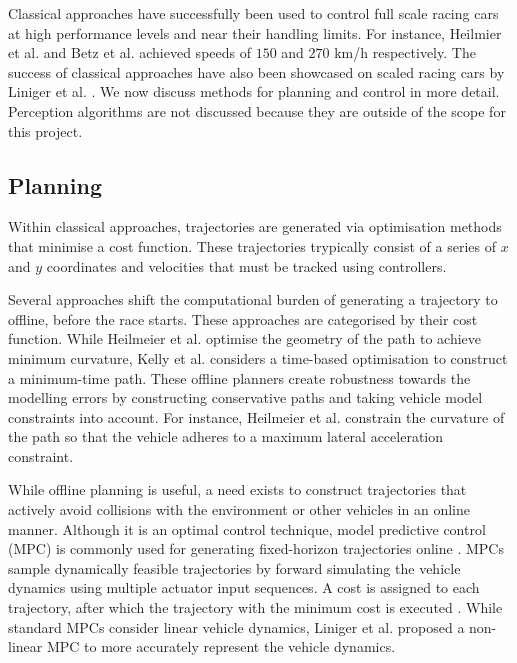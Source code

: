 Classical approaches have successfully been used to control full scale racing cars \cite{Valls2018, alvarez2022, Nekkah2020} at high performance levels and near their handling limits.
For instance, Heilmier et al. \cite{Heilmeier2020} and
Betz et al. \cite{Betz_2023} achieved speeds of $150$ and $270$ km/h respectively.
The success of classical approaches have also been showcased on scaled racing cars by Liniger et al. \cite{Liniger2015}.
We now discuss methods for planning and control in more detail.
Perception algorithms are not discussed because they are outside of the scope for this project.

\subsection{Planning}\label{sec:trajectory_planning}
Within classical approaches, trajectories are generated via optimisation methods that minimise a cost function.
These trajectories trypically consist of a series of $x$ and $y$ coordinates and velocities that must be tracked using controllers.

Several approaches \cite{Heilmeier2020, Kelly2010, Herrmann2019} shift the computational burden of generating a trajectory to offline, before the race starts.
These approaches are categorised by their cost function.
While Heilmeier et al. \cite{Heilmeier2020} optimise the geometry of the path to achieve minimum curvature, Kelly et al. \cite{Kelly2010} considers a time-based optimisation to construct a minimum-time path.
These offline planners create robustness towards the modelling errors by constructing conservative paths and taking vehicle model constraints into account.
For instance, Heilmeier et al. \cite{Heilmeier2020} constrain the curvature of the path so that the vehicle adheres to a maximum lateral acceleration constraint.

While offline planning is useful, a need exists to construct trajectories that actively avoid collisions with the environment or other vehicles in an online manner.
Although it is an optimal control technique, model predictive control (MPC) is commonly used for generating fixed-horizon trajectories online \cite{Liniger2015a, Liniger2015, Anderson2016, Funke2017}.
MPCs sample dynamically feasible trajectories by forward simulating the vehicle dynamics using multiple actuator input sequences.
A cost is assigned to each trajectory, after which the trajectory with the minimum cost is executed \cite{Betz2021}. 
While standard MPCs consider linear vehicle dynamics, Liniger et al. \cite{Liniger2015} proposed a non-linear MPC to more accurately represent the vehicle dynamics.

